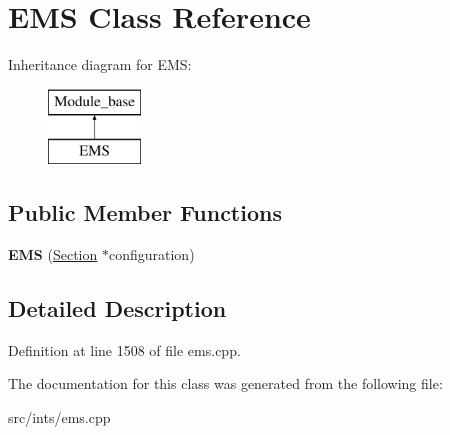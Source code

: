 \hypertarget{classEMS}{\section{E\-M\-S Class Reference}
\label{classEMS}
}
Inheritance diagram for E\-M\-S\-:\begin{figure}[H]
\begin{center}
\leavevmode
\includegraphics[height=2.000000cm]{classEMS}
\end{center}
\end{figure}
\subsection*{Public Member Functions}
\begin{DoxyCompactItemize}
\item 
\hypertarget{classEMS_a580595567b3555bb47ee6d0eb1187815}{{\bfseries E\-M\-S} (\hyperlink{classSection}{Section} $\ast$configuration)}\label{classEMS_a580595567b3555bb47ee6d0eb1187815}

\end{DoxyCompactItemize}


\subsection{Detailed Description}


Definition at line 1508 of file ems.\-cpp.



The documentation for this class was generated from the following file\-:\begin{DoxyCompactItemize}
\item 
src/ints/ems.\-cpp\end{DoxyCompactItemize}
